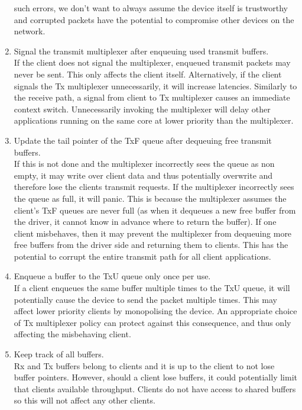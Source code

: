 \begin{enumerate}
    such errors, we don't want to always assume the device itself is trustworthy and corrupted packets have the potential to compromise
    other devices on the network.
    \item Signal the transmit multiplexer after enqueuing used transmit buffers.\\
    If the client does not signal the multiplexer, enqueued transmit packets may never be sent. This only affects the client itself.
    Alternatively, if the client signals the Tx multiplexer unnecessarily, it will increase latencies. Similarly to the receive path,
    a signal from client to Tx multiplexer causes an immediate context switch. Unnecessarily invoking the multiplexer will delay other 
    applications running on the same core at lower priority than the multiplexer.
    \item Update the tail pointer of the TxF queue after dequeuing free transmit buffers.\\
    If this is not done and the multiplexer incorrectly sees the queue as non empty, it may write over client data and
    thus potentially overwrite and therefore lose the clients transmit requests. If
    the multiplexer incorrectly sees the queue as full, it will panic. This is because the multiplexer assumes the client's 
    TxF queues are never full (as when it dequeues a new free buffer from the driver, it cannot know in advance where 
    to return the buffer). If one client misbehaves, then it may prevent the multiplexer from dequeuing more free buffers 
    from the driver side and returning them to clients. This has the potential to corrupt the entire transmit path for all
    client applications.
    \item Enqueue a buffer to the TxU queue only once per use.\\
    If a client enqueues the same buffer multiple times to the TxU queue, it will potentially cause the device to send the
    packet multiple times. This may affect lower priority clients by monopolising the device. An appropriate choice of Tx multiplexer
    policy can protect against this consequence, and thus only affecting the misbehaving client.
    \item Keep track of all buffers.\\
    Rx and Tx buffers belong to clients and it is up to the client to not lose buffer pointers. However, should a client lose
    buffers, it could potentially limit that clients available throughput. Clients do not have access to shared buffers so this
    will not affect any other clients.
\end{enumerate}

